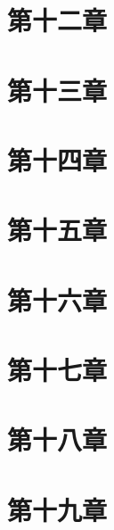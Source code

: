 \documentclass[12pt,a4paper,oneside,openany]{book}
\begin{document}
\chapter{第十二章}


\chapter{第十三章}


\chapter{第十四章}


\chapter{第十五章}


\chapter{第十六章}


\chapter{第十七章}


\chapter{第十八章}


\chapter{第十九章}

\end{document}
